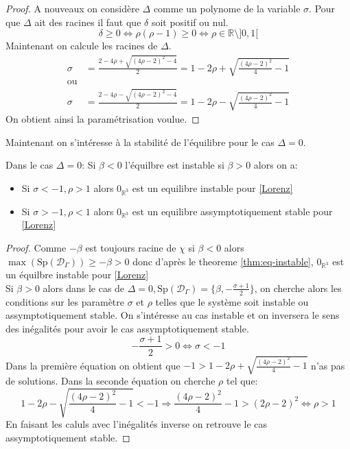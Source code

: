 \documentclass{article}
\newcommand{\R}{\mathbb{R}}
\newtheorem[M , nocut]{prop}{Proposition}[section]
\newtheorem[M]{propt}{Propriété}[section]
\newtheorem[L , nocut]{thm}{Théoreme}
\newtheorem[L]{cor}{Corollaire}
\begin{document}
\begin{proof}
    A nouveaux on considère $\Delta$ comme un polynome de la variable $\sigma$. Pour que $\Delta$ ait des racines il faut que $\delta$ soit positif ou nul.
    \[
    \delta \ge 0 \Leftrightarrow \rho(\rho-1) \ge 0 \Leftrightarrow \rho \in \R \setminus ]0,1[
    \] Maintenant on calcule les racines de $\Delta$.
    \begin{align*}
        \sigma &= \frac{2-4\rho + \sqrt{ (4\rho-2)^2 -4 }}{2} = 1-2 \rho + \sqrt{ \frac{(4\rho-2)^2}{4} -1 }\\
        \text{ou}\\
        \sigma &= \frac{2-4\rho - \sqrt{ (4\rho-2)^2 -4 }}{2} = 1-2 \rho - \sqrt{ \frac{(4\rho-2)^2}{4} -1 }
    \end{align*}
    On obtient ainsi la paramétrisation voulue.
\end{proof}
Maintenant on s'intéresse à la stabilité de l'équilibre pour le cas $\Delta=0$.
\begin{prop}\label{prop:eqDeg0}
    Dans le cas $\Delta=0$:
    Si $\beta <0$ l'équilbre est instable si $\beta>0$ alors on a:
    \begin{itemize}
        \item Si $\sigma < -1 , \rho > 1$ alors $0_{\R^3}$ est un equilibre instable pour \eqref{Lorenz}
        \item Si $\sigma > -1 , \rho < 1$ alors $0_{\R^3}$ est un equilibre assymptotiquement stable pour \eqref{Lorenz}
    \end{itemize}
\end{prop}
\begin{proof} %
    Comme $-\beta$ est toujours racine de $\chi$ si $\beta <0$ alors $\max (\mathrm{Sp}(\mathcal{D}_\Gamma)) \ge -\beta > 0$ donc d'après le theoreme \ref{thm:eq-instable}, $0_{\R^3}$ est un équilbre instable pour \eqref{Lorenz}\\
    Si $\beta > 0$ alors dans le cas de $\Delta = 0, \mathrm{Sp}(\mathcal{D}_\Gamma) = \{\beta, -\frac{\sigma+1}{2}\}$, on cherche alors les conditions sur les paramètre $\sigma$ et $\rho$ telles que le système soit instable ou assymptotiquement stable.
    On s'intéresse au cas instable et on inversera le sens des inégalités pour avoir le cas assymptotiquement stable. 
    \[
        -\frac{\sigma+1}{2} >0 \Leftrightarrow \sigma < -1   
    \]
    Dans la première équation on obtient que $-1 > 1-2 \rho + \sqrt{ \frac{(4\rho-2)^2}{4} -1}$ n'as pas de solutions.
    Dans la seconde équation on cherche $\rho$ tel que:
    \[
        1-2 \rho - \sqrt{ \frac{(4\rho-2)^2}{4} -1 } < -1 \Rightarrow \frac{(4\rho-2)^2}{4} -1 > (2\rho-2)^2 \Leftrightarrow \rho > 1 
    \]En faisant les caluls avec l'inégalités inverse on retrouve le cas assymptotiquement stable.
\end{proof}
\end{document}
